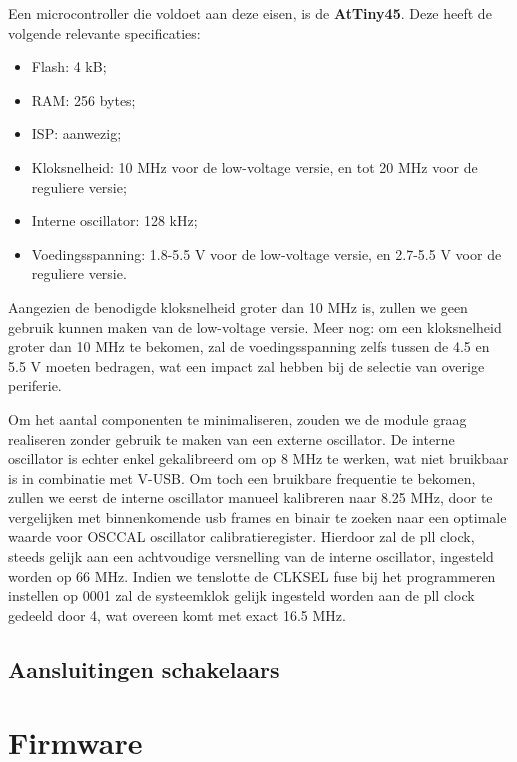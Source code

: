 Een microcontroller die voldoet aan deze eisen, is de \textbf{AtTiny45}. Deze heeft de volgende relevante specificaties:
\begin{itemize}
\item Flash: 4 kB;
\item RAM: 256 bytes;
\item ISP: aanwezig;
\item Kloksnelheid: 10 MHz voor de low-voltage versie, en tot 20 MHz voor de reguliere versie;
\item Interne oscillator: 128 kHz;
\item Voedingsspanning: 1.8-5.5 V voor de low-voltage versie, en 2.7-5.5 V voor de reguliere versie.
\end{itemize}

Aangezien de benodigde kloksnelheid groter dan 10 MHz is, zullen we geen gebruik kunnen maken van de low-voltage versie. Meer nog: om een kloksnelheid groter dan 10 MHz te bekomen, zal de voedingsspanning zelfs tussen de 4.5 en 5.5 V moeten bedragen, wat een impact zal hebben bij de selectie van overige periferie.

Om het aantal componenten te minimaliseren, zouden we de module graag realiseren zonder gebruik te maken van een externe oscillator. De interne oscillator is echter enkel gekalibreerd om op 8 MHz te werken, wat niet bruikbaar is in combinatie met V-USB. Om toch een bruikbare frequentie te bekomen, zullen we eerst de interne oscillator manueel kalibreren naar 8.25 MHz, door te vergelijken met binnenkomende \ac{usb} frames en binair te zoeken naar een optimale waarde voor OSCCAL oscillator calibratieregister. Hierdoor zal de \ac{pll} clock, steeds gelijk aan een achtvoudige versnelling van de interne oscillator, ingesteld worden op 66 MHz. Indien we tenslotte de CLKSEL fuse bij het programmeren instellen op 0001 zal de systeemklok gelijk ingesteld worden aan de \ac{pll} clock gedeeld door 4, wat overeen komt met exact 16.5 MHz.

\section{Aansluitingen schakelaars}

\chapter{Firmware}